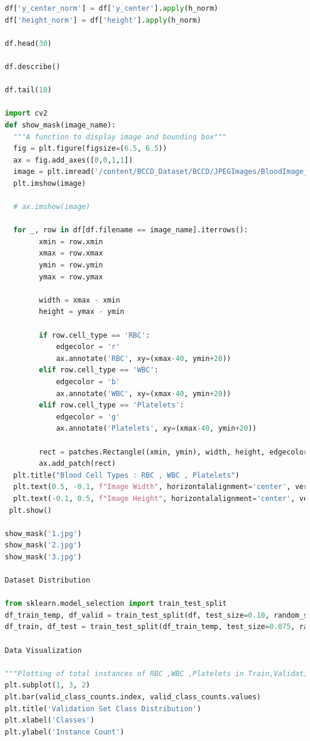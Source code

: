 \begin{lstlisting}[language=Python, caption={Code snippet in \LaTeX ~and  this is a Python code }, label=list:python_code_ex]
df['y_center_norm'] = df['y_center'].apply(h_norm)
df['height_norm'] = df['height'].apply(h_norm)

df.head(30)

df.describe()

df.tail(10)

import cv2
def show_mask(image_name):
  """A function to display image and bounding box"""
  fig = plt.figure(figsize=(6.5, 6.5))
  ax = fig.add_axes([0,0,1,1])
  image = plt.imread('/content/BCCD_Dataset/BCCD/JPEGImages/BloodImage_0000' + image_name)
  plt.imshow(image)

  # ax.imshow(image)

  for _, row in df[df.filename == image_name].iterrows():
        xmin = row.xmin
        xmax = row.xmax
        ymin = row.ymin
        ymax = row.ymax

        width = xmax - xmin
        height = ymax - ymin

        if row.cell_type == 'RBC':
            edgecolor = 'r'
            ax.annotate('RBC', xy=(xmax-40, ymin+20))
        elif row.cell_type == 'WBC':
            edgecolor = 'b'
            ax.annotate('WBC', xy=(xmax-40, ymin+20))
        elif row.cell_type == 'Platelets':
            edgecolor = 'g'
            ax.annotate('Platelets', xy=(xmax-40, ymin+20))

        rect = patches.Rectangle((xmin, ymin), width, height, edgecolor=edgecolor, facecolor='none')
        ax.add_patch(rect)
  plt.title("Blood Cell Types : RBC , WBC , Platelets")
  plt.text(0.5, -0.1, f"Image Width", horizontalalignment='center', verticalalignment='center', transform=plt.gca().transAxes)
  plt.text(-0.1, 0.5, f"Image Height", horizontalalignment='center', verticalalignment='center', rotation=90, transform=plt.gca().transAxes)
 plt.show()

show_mask('1.jpg')
show_mask('2.jpg')
show_mask('3.jpg')

Dataset Distribution

from sklearn.model_selection import train_test_split
df_train_temp, df_valid = train_test_split(df, test_size=0.10, random_state=42, shuffle=True, stratify=df['cell_type'])
df_train, df_test = train_test_split(df_train_temp, test_size=0.075, random_state=42, shuffle=True, stratify=df_train_temp['cell_type'])

Data Visualization

"""Plotting of total instances of RBC ,WBC ,Platelets in Train,Validation an Test Dataset"""
plt.subplot(1, 3, 2)
plt.bar(valid_class_counts.index, valid_class_counts.values)
plt.title('Validation Set Class Distribution')
plt.xlabel('Classes')
plt.ylabel('Instance Count')


\end{lstlisting}
